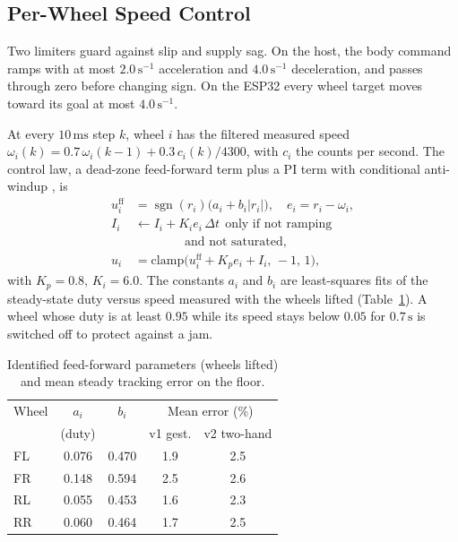 \documentclass[5p,twocolumn]{elsarticle}
\begin{document}
\subsection{Per-Wheel Speed Control}\label{sec:wheelctrl}
Two limiters guard against slip and supply sag. On the host, the body command ramps with at most $2.0\,\mathrm{s^{-1}}$ acceleration and $4.0\,\mathrm{s^{-1}}$ deceleration, and passes through zero before changing sign. On the ESP32 every wheel target moves toward its goal at most $4.0\,\mathrm{s^{-1}}$.

At every $10\,\mathrm{ms}$ step $k$, wheel $i$ has the filtered measured speed $\omega_i(k)=0.7\,\omega_i(k-1)+0.3\,c_i(k)/4300$, with $c_i$ the counts per second. The control law, a dead-zone feed-forward term \cite{tao1996} plus a PI term with conditional anti-windup \cite{astrom2006}, is
\begin{align}
u^{\mathrm{ff}}_i&=\operatorname{sgn}(r_i)\bigl(a_i+b_i|r_i|\bigr),\quad e_i=r_i-\omega_i,\nonumber\\
I_i&\leftarrow I_i+K_i e_i\,\Delta t\ \ \text{only if not ramping}\nonumber\\
&\qquad\qquad\text{and not saturated},\nonumber\\
u_i&=\mathrm{clamp}\bigl(u^{\mathrm{ff}}_i+K_p e_i+I_i,\,-1,\,1\bigr),\label{eq:ctrl}
\end{align}
with $K_p=0.8$, $K_i=6.0$. The constants $a_i$ and $b_i$ are least-squares fits of the steady-state duty versus speed measured with the wheels lifted (Table~\ref{tab:ff}). A wheel whose duty is at least $0.95$ while its speed stays below $0.05$ for $0.7\,\mathrm{s}$ is switched off to protect against a jam.

\begin{table}[!t]
\caption{Identified feed-forward parameters (wheels lifted) and mean steady tracking error on the floor.}
\label{tab:ff}
\centering
\small
\begin{tabular}{lcccc}
\toprule
Wheel & $a_i$ & $b_i$ & \multicolumn{2}{c}{Mean error (\%)} \\
 & (duty) & & v1 gest. & v2 two-hand \\
\midrule
FL & 0.076 & 0.470 & 1.9 & 2.5 \\
FR & 0.148 & 0.594 & 2.5 & 2.6 \\
RL & 0.055 & 0.453 & 1.6 & 2.3 \\
RR & 0.060 & 0.464 & 1.7 & 2.5 \\
\bottomrule
\end{tabular}
\end{table}
\end{document}
